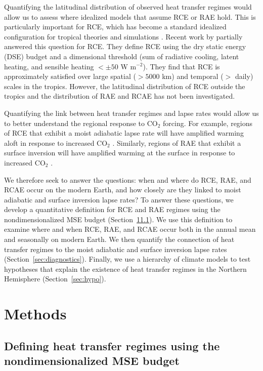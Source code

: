 \documentclass{ametsocV5}
\begin{document}
Quantifying the latitudinal distribution of observed heat transfer regimes would allow us to assess where idealized models that assume RCE or RAE hold. This is particularly important for RCE, which has become a standard idealized configuration for tropical theories \citep[e.g.,][]{emanuel1996,nilsson1999,romps2014,singh2015} and simulations \citep[][and the references therein]{wing2018}. Recent work by \cite{jakob2019} partially answered this question for RCE. They define RCE using the dry static energy (DSE) budget and a dimensional threshold (sum of radiative cooling, latent heating, and sensible heating $< \pm 50$ W m$^{-2}$). They find that RCE is approximately satisfied over large spatial ($>5000$ km) and temporal ($>$ daily) scales in the tropics. However, the latitudinal distribution of RCE outside the tropics and the distribution of RAE and RCAE has not been investigated.

Quantifying the link between heat transfer regimes and lapse rates would allow us to better understand the regional response to CO$_2$ forcing. For example, regions of RCE that exhibit a moist adiabatic lapse rate will have amplified warming aloft in response to increased CO$_2$ \citep{held1993, romps2011}. Similarly, regions of RAE that exhibit a surface inversion will have amplified warming at the surface in response to increased CO$_2$ \citep{held1993, cronin2016}.

We therefore seek to answer the questions: when and where do RCE, RAE, and RCAE occur on the modern Earth, and how closely are they linked to moist adiabatic and surface inversion lapse rates? To answer these questions, we develop a quantitative definition for RCE and RAE regimes using the nondimensionalized MSE budget (Section~\ref{sec:methods}\ref{subsec:mse}). We use this definition to examine where and when RCE, RAE, and RCAE occur both in the annual mean and seasonally on modern Earth. We then quantify the connection of heat transfer regimes to the moist adiabatic and surface inversion lapse rates (Section~\ref{sec:diagnostics}). Finally, we use a hierarchy of climate models to test hypotheses that explain the existence of heat transfer regimes in the Northern Hemisphere (Section~\ref{sec:hypo}).

\section{Methods}\label{sec:methods}

    \subsection{Defining heat transfer regimes using the nondimensionalized MSE budget} \label{subsec:mse}
\end{document}
